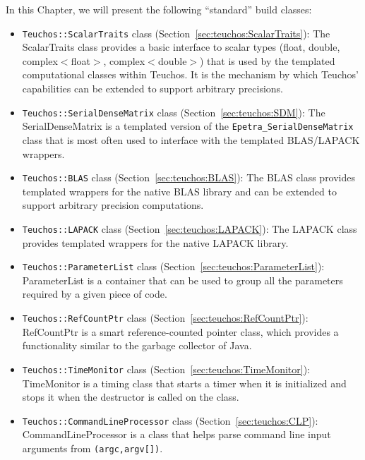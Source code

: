 In this Chapter, we will present the following ``standard'' build classes:
\begin{itemize}

\item \verb!Teuchos::ScalarTraits! class (Section~\ref{sec:teuchos:ScalarTraits}):
  The ScalarTraits class provides a basic interface to scalar types (float, double, 
  complex$<$float$>$, complex$<$double$>$) that is used by the templated computational
  classes within Teuchos.  It is the mechanism by which Teuchos' capabilities 
  can be extended to support arbitrary precisions.

\item \verb!Teuchos::SerialDenseMatrix! class (Section~\ref{sec:teuchos:SDM}): 
  The SerialDenseMatrix is a templated version of the \verb!Epetra_SerialDenseMatrix! class
  that is most often used to interface with the templated BLAS/LAPACK wrappers.

\item \verb!Teuchos::BLAS! class (Section~\ref{sec:teuchos:BLAS}):
  The BLAS class provides templated wrappers
  for the native BLAS library and can be extended to support arbitrary precision
  computations.  

\item \verb!Teuchos::LAPACK! class (Section~\ref{sec:teuchos:LAPACK}):
  The LAPACK class provides templated wrappers for the native LAPACK library.

\item \verb!Teuchos::ParameterList! class (Section~\ref{sec:teuchos:ParameterList}):
  ParameterList is a container that can be used to group all the parameters required by a
  given piece of code.

\item \verb!Teuchos::RefCountPtr! class (Section~\ref{sec:teuchos:RefCountPtr}):
  RefCountPtr is a smart reference-counted pointer class, which provides a functionality
  similar to the garbage collector of Java. 

\item \verb!Teuchos::TimeMonitor! class (Section~\ref{sec:teuchos:TimeMonitor}):
  TimeMonitor is a timing class that starts a timer when it is initialized and
  stops it when the destructor is called on the class.

\item \verb!Teuchos::CommandLineProcessor! class (Section~\ref{sec:teuchos:CLP}): 
  CommandLineProcessor is a class that helps parse command line input arguments from 
  \verb!(argc,argv[])!.   
\end{itemize}


